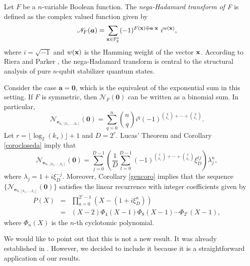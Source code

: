 \begin{example}
 Let $F$ be a $n$-variable Boolean function.  The {\it nega-Hadamard transform of F} is defined as the complex valued function given by
\begin{equation}
\label{nega1}
 \mathcal{N}_{F}(\boldsymbol{a}) = \sum_{{\bf x} \in \mathbb{F}_2^n} (-1)^{F({\bf x})\oplus\boldsymbol{a}\cdot {\bf x}} \,\,i^{w({\bf x})},
\end{equation}
where $i=\sqrt{-1}$ and $w({\bf x})$ is the Hamming weight of the vector ${\bf x}$.  According to Riera and Parker \cite{rp}, the nega-Hadamard transform is central
to the structural analysis of pure $n$-qubit stabilizer quantum states.

Consider the case $\boldsymbol{a}=\boldsymbol{0}$, which is the equivalent of the exponential sum in this setting.  If $F$ is symmetric, then $\mathcal{N}_{F}(\boldsymbol{0})$ can be written as a 
binomial sum.  In particular,
\begin{equation}
 \mathcal{N}_{\boldsymbol{e}_{n,[k_1,\ldots,k_s]}}(\boldsymbol{0})=\sum_{q=0}^n \binom{n}{q} i^{q} (-1)^{\binom{q}{k_1}+\cdots+\binom{q}{k_s}}.
\end{equation}
Let $r=\lfloor\log_2(k_s)\rfloor+1$ and $D=2^{r}$.  Lucas' Theorem and Corollary \ref{corocloseda} imply that
\begin{equation}
\mathcal{N}_{\boldsymbol{e}_{n,[k_1,\ldots,k_s]}}(\boldsymbol{0}) = \sum_{j=0}^{D-1} \left(\frac{1}{D}\sum_{t=0}^{D-1}(-1)^{\binom{t}{k_1}+\cdots+\binom{t}{k_s}}\xi_D^{tj}\right)\lambda_j^n,
\end{equation}
where $\lambda_j = 1+i \xi_D^{-j}$.  Moreover, Corollary \ref{gencoro} implies that the sequence $\{\mathcal{N}_{\boldsymbol{e}_{n,[k_1,\ldots,k_s]}}(\boldsymbol{0})\}$ satisfies the linear
recurrence with integer coefficients given by
\begin{eqnarray}
 P(X)&=& \prod_{a=0}^{2^r-1} \left(X-(1+i \xi_D^a)\right)\\\nonumber
 &=& (X-2)\Phi_{4}(X-1)\Phi_8(X-1)\cdots \Phi_{2^r}(X-1),
\end{eqnarray}
where $\Phi_n(X)$ is the $n$-th cyclotomic polynomial.

We would like to point out that this is not a new result. It was already established in \cite{cms}.  However, we decided to include it because it is a straightforward application of our results.
 \end{example}



